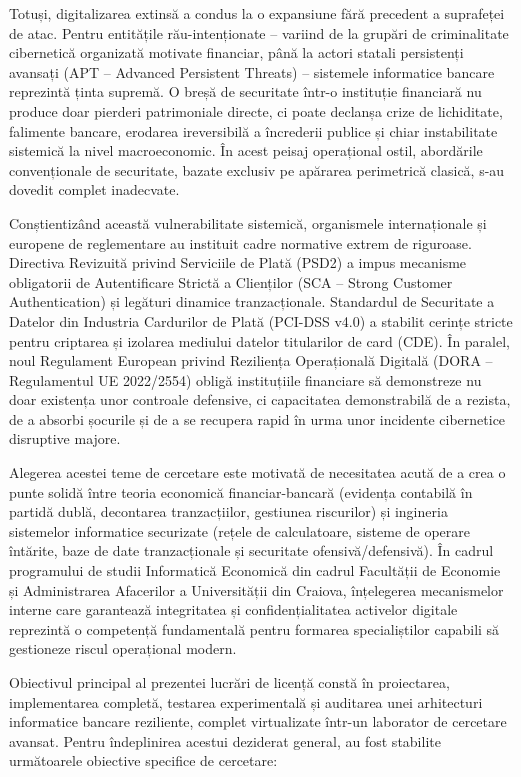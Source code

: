 \documentclass[
]{article}
\begin{document}
Totuși, digitalizarea extinsă a condus la o expansiune fără precedent a
suprafeței de atac. Pentru entitățile rău-intenționate -- variind de la
grupări de criminalitate cibernetică organizată motivate financiar, până
la actori statali persistenți avansați (APT -- Advanced Persistent
Threats) -- sistemele informatice bancare reprezintă ținta supremă. O
breșă de securitate într-o instituție financiară nu produce doar
pierderi patrimoniale directe, ci poate declanșa crize de lichiditate,
falimente bancare, erodarea ireversibilă a încrederii publice și chiar
instabilitate sistemică la nivel macroeconomic. În acest peisaj
operațional ostil, abordările convenționale de securitate, bazate
exclusiv pe apărarea perimetrică clasică, s-au dovedit complet
inadecvate.

Conștientizând această vulnerabilitate sistemică, organismele
internaționale și europene de reglementare au instituit cadre normative
extrem de riguroase. Directiva Revizuită privind Serviciile de Plată
(PSD2) a impus mecanisme obligatorii de Autentificare Strictă a
Clienților (SCA -- Strong Customer Authentication) și legături dinamice
tranzacționale. Standardul de Securitate a Datelor din Industria
Cardurilor de Plată (PCI-DSS v4.0) a stabilit cerințe stricte pentru
criptarea și izolarea mediului datelor titularilor de card (CDE). În
paralel, noul Regulament European privind Reziliența Operațională
Digitală (DORA -- Regulamentul UE 2022/2554) obligă instituțiile
financiare să demonstreze nu doar existența unor controale defensive, ci
capacitatea demonstrabilă de a rezista, de a absorbi șocurile și de a se
recupera rapid în urma unor incidente cibernetice disruptive majore.

Alegerea acestei teme de cercetare este motivată de necesitatea acută de
a crea o punte solidă între teoria economică financiar-bancară (evidența
contabilă în partidă dublă, decontarea tranzacțiilor, gestiunea
riscurilor) și ingineria sistemelor informatice securizate (rețele de
calculatoare, sisteme de operare întărite, baze de date tranzacționale
și securitate ofensivă/defensivă). În cadrul programului de studii
Informatică Economică din cadrul Facultății de Economie și Administrarea
Afacerilor a Universității din Craiova, înțelegerea mecanismelor interne
care garantează integritatea și confidențialitatea activelor digitale
reprezintă o competență fundamentală pentru formarea specialiștilor
capabili să gestioneze riscul operațional modern.

Obiectivul principal al prezentei lucrări de licență constă în
proiectarea, implementarea completă, testarea experimentală și auditarea
unei arhitecturi informatice bancare reziliente, complet virtualizate
într-un laborator de cercetare avansat. Pentru îndeplinirea acestui
deziderat general, au fost stabilite următoarele obiective specifice de
cercetare:
\end{document}
